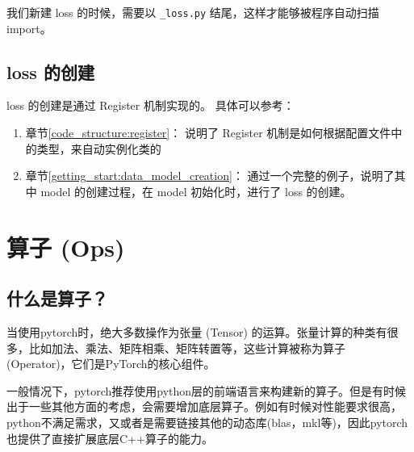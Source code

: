 \documentclass[../main.tex]{subfiles}
\begin{document}
\vspace{0.5cm}
\renewcommand*\DTstyle{\ttfamily\textcolor{black}}
\vspace{0.5cm}

\begin{hl} %
    我们新建 loss 的时候，需要以 \texttt{\_loss.py} 结尾，这样才能够被程序自动扫描 import。
\end{hl}

\subsection{loss 的创建}\label{code_structure:loss_creation}

loss 的创建是通过 Register 机制实现的。
具体可以参考：
\begin{enumerate}
    \item 章节\ref{code_structure:register}： 说明了 Register 机制是如何根据配置文件中的类型，来自动实例化类的
    \item 章节\ref{getting_start:data_model_creation}： 通过一个完整的例子，说明了其中 model 的创建过程，在 model 初始化时，进行了 loss 的创建。
\end{enumerate}


\section{算子 (Ops)}\label{code_structure:ops}

\subsection{什么是算子？}

当使用pytorch时，绝大多数操作为张量 (Tensor) 的运算。张量计算的种类有很多，比如加法、乘法、矩阵相乘、矩阵转置等，这些计算被称为算子 (Operator)，它们是PyTorch的核心组件。

一般情况下，pytorch推荐使用python层的前端语言来构建新的算子。但是有时候出于一些其他方面的考虑，会需要增加底层算子。例如有时候对性能要求很高，python不满足需求，又或者是需要链接其他的动态库(blas，mkl等)，因此pytorch也提供了直接扩展底层C++算子的能力。
\end{document}
